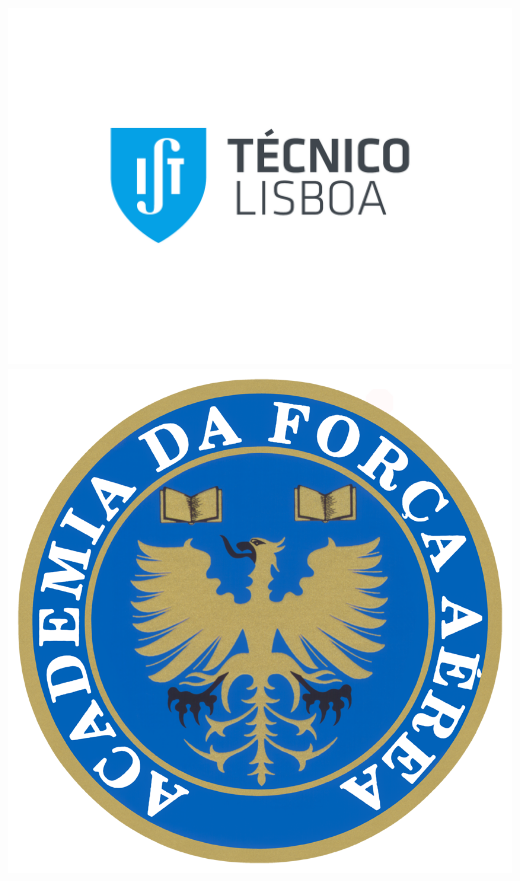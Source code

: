 
\thispagestyle {empty}

\includegraphics[bb=9.5cm 11cm 0cm 0cm,scale=0.29]{IST_A_CMYK_POS}
\includegraphics[bb=-95cm 15cm 0cm 0cm,scale=0.15]{Figures/afa}

